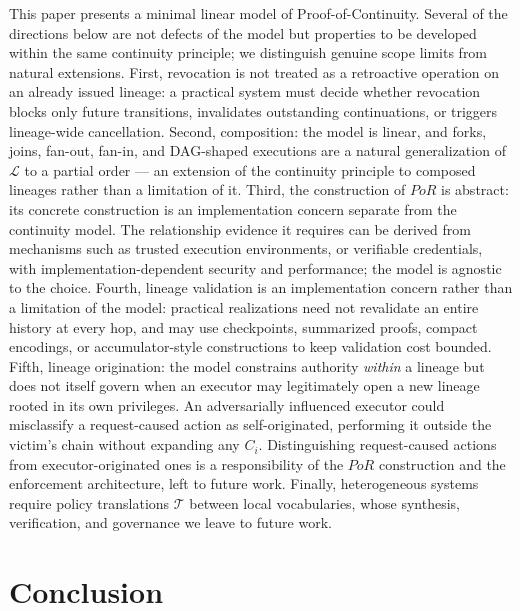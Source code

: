 \documentclass[11pt]{article}
\begin{document}
This paper presents a minimal linear model of Proof-of-Continuity. Several of the
directions below are not defects of the model but properties to be developed
within the same continuity principle; we distinguish genuine scope limits from
natural extensions. First, revocation is not treated as a
retroactive operation on an already issued lineage: a practical system must
decide whether revocation blocks only future transitions, invalidates
outstanding continuations, or triggers lineage-wide cancellation. Second,
composition: the model is linear, and forks, joins, fan-out, fan-in, and
DAG-shaped executions are a natural generalization of $\mathcal{L}$ to a partial
order --- an extension of the continuity principle to composed lineages rather
than a limitation of it. Third, the construction of
$PoR$ is abstract: its concrete construction is an implementation concern
separate from the continuity model. The relationship evidence it requires can be
derived from mechanisms such as trusted execution environments, or
verifiable credentials, with implementation-dependent security and performance;
the model is agnostic to the choice.
Fourth, lineage validation is an implementation concern rather than a limitation
of the model: practical realizations need not revalidate an entire history at
every hop, and may use checkpoints, summarized proofs, compact encodings, or
accumulator-style constructions to keep validation cost bounded.
Fifth, lineage origination: the model constrains authority \emph{within} a lineage
but does not itself govern when an executor may legitimately open a new lineage
rooted in its own privileges. An adversarially influenced executor could
misclassify a request-caused action as self-originated, performing it outside the
victim's chain without expanding any $C_i$. Distinguishing request-caused actions
from executor-originated ones is a responsibility of the $PoR$ construction and the
enforcement architecture, left to future work.
Finally, heterogeneous systems require policy translations $\mathcal{T}$ between
local vocabularies, whose synthesis, verification, and governance we leave to
future work.

\section{Conclusion}
\end{document}
